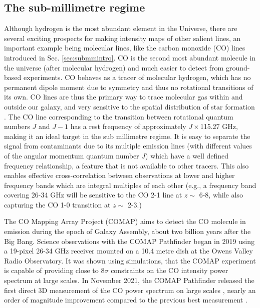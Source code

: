 \subsection{The sub-millimetre regime}
\label{s:submmhalomodel}

Although hydrogen is the most abundant element in the Universe, there are several exciting prospects for making intensity maps of other salient lines, an important example being molecular lines, like the carbon monoxide (CO) lines introduced in Sec. \ref{sec:submmintro}. CO is the second most abundant molecule in the universe (after molecular hydrogen) and much easier to detect from ground-based experiments. CO behaves as a tracer of molecular hydrogen, which has no permanent dipole moment due to symmetry and thus no rotational transitions of its own.  CO lines are thus the primary way to trace molecular gas within and outside our galaxy, and very sensitive to the spatial distribution of star formation \cite{hploebsfr2020}. The CO line corresponding to the transition between rotational quantum numbers $J$ and $J - 1$ has a rest frequency of approximately $J \times$115.27 GHz, making it an ideal target in the sub millimetre regime. It is easy to separate the signal from contaminants due to its multiple emission lines (with different values of the angular momentum quantum number $J$) which have a  well defined frequency relationship, a feature that is not available to other tracers. This also enables effective cross-correlation between observations at lower and higher frequency bands which are integral multiples of each other (e.g., a  frequency band covering 26-34 GHz will be sensitive to the CO 2-1 line at $z \sim$ 6-8, while also capturing the CO 1-0 transition at $z \sim$ 2-3.) 



The CO Mapping Array Project (COMAP) aims to detect the CO molecule in emission during the epoch of Galaxy Assembly, about two billion years after the Big Bang. Science observations with the COMAP Pathfinder began in 2019 using a 19-pixel 26-34 GHz receiver mounted on a 10.4 metre dish at the  Owens Valley Radio Observatory.  It was shown \cite{li2015} using simulations, that the COMAP experiment is capable of providing close to 8$\sigma$ constraints on the CO intensity power spectrum at large scales. In November 2021, the COMAP Pathfinder released the first direct 3D measurement of the CO power spectrum on large scales \cite{cleary2021}, nearly an
              order of magnitude improvement compared to the previous
              best measurement \cite{keating2020}. 

